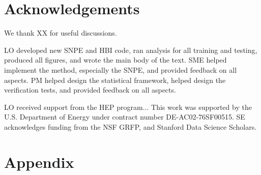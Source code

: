 \documentclass[iop]{desc-tex/styles/emulateapj}
\begin{document}
\section{Acknowledgements}

We thank XX for useful discussions.

LO developed new SNPE and HBI code, ran analysis for all training and testing, produced all figures, and wrote the main body of the text. SME helped implement the method, especially the SNPE, and provided feedback on all aspects. PM helped design the statistical framework, helped design the verification tests, and provided feedback on all aspects. 

LO received support from the HEP program...
This work was supported by the U.S. Department of Energy under contract number DE-AC02-76SF00515.
SE acknowledges funding from the NSF GRFP, and Stanford Data Science Scholars.
 



\appendix

\section{Appendix}
\label{appendix}
\end{document}
